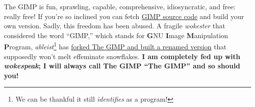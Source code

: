 The GIMP is fun, sprawling, capable, comprehensive, idiosyncratic, and
free: really free! If you're so inclined you can fetch
\href{https://gitlab.gnome.org/GNOME/gimp}{GIMP source code} and build
your own version. Sadly, this freedom has been abused. A fragile
\emph{wokester} that considered the word ``GIMP,'' which stands for
\textbf{G}NU \textbf{I}mage \textbf{M}anipulation \textbf{P}rogram,
\emph{ableist}\footnote{We can be thankful it still \emph{identifies} as a
  program!} has
\href{https://thenextweb.com/dd/2019/08/28/developer-forks-gimp-image-editor-over-naughty-name/}{forked
The GIMP and built a renamed version} that supposedly won't melt
effeminate snowflakes. \textbf{I am completely fed up with
\emph{wokespeak}; I will always call The GIMP ``The GIMP'' and so should
you!}

%


%
%
%
%



